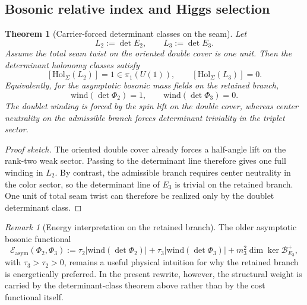 \documentclass[11pt,a4paper]{article}
\newtheorem{theorem}{Theorem}[section]
\theoremstyle{definition}
\theoremstyle{remark}
\newtheorem*{remark}{Remark}
\begin{document}
\subsection{Bosonic relative index and Higgs selection}

\begin{theorem}[Carrier-forced determinant classes on the seam]
\label{thm:determinant-class-higgs-selection}
Let
\[
L_2:=\det E_2,
\qquad
L_3:=\det E_3.
\]
Assume the total seam twist on the oriented double cover is one unit. Then the determinant holonomy classes satisfy
\[
[\mathrm{Hol}_\Sigma(L_2)]=1\in\pi_1(U(1)),
\qquad
[\mathrm{Hol}_\Sigma(L_3)]=0.
\]
Equivalently, for the asymptotic bosonic mass fields on the retained branch,
\[
\mathrm{wind}(\det\Phi_2)=1,
\qquad
\mathrm{wind}(\det\Phi_3)=0.
\]
The doublet winding is forced by the spin lift on the double cover, whereas center neutrality on the admissible branch forces determinant triviality in the triplet sector.
\end{theorem}

\begin{proof}[Proof sketch]
The oriented double cover already forces a half-angle lift on the rank-two weak sector. Passing to the determinant line therefore gives one full winding in $L_2$. By contrast, the admissible branch requires center neutrality in the color sector, so the determinant line of $E_3$ is trivial on the retained branch. One unit of total seam twist can therefore be realized only by the doublet determinant class.
\end{proof}

\begin{remark}[Energy interpretation on the retained branch]
The older asymptotic bosonic functional
\[
\mathcal E_{\mathrm{asym}}(\Phi_2,\Phi_3)
:=
\tau_2\bigl|\mathrm{wind}(\det\Phi_2)\bigr|
+\tau_3\bigl|\mathrm{wind}(\det\Phi_3)\bigr|
+m_3^2\dim\ker\mathcal B_{E_3}^+,
\]
with $\tau_3>\tau_2>0$, remains a useful physical intuition for why the retained branch is energetically preferred. In the present rewrite, however, the structural weight is carried by the determinant-class theorem above rather than by the cost functional itself.
\end{remark}
\end{document}
